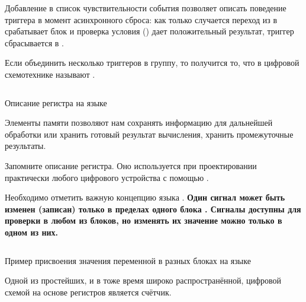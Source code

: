 \par{Добавление в список чувствительности события  позволяет описать поведение триггера в момент асинхронного сброса: как только случается переход  из  в  срабатывает блок  и проверка условия  () дает положительный результат, триггер сбрасывается в .}

\par{}

\par{Если объединить несколько триггеров в группу, то получится то, что в цифровой схемотехнике называют .}

%
\begin{listing}[H]
	\inputminted{SystemVerilog}{code_examples/lab_2/register.sv}
	\caption{Описание регистра на языке }
\end{listing}


\par{Элементы памяти позволяют нам сохранять информацию для дальнейшей обработки или хранить готовый результат вычисления, хранить промежуточные результаты.}

\par{Запомните описание регистра. Оно используется при проектировании практически любого цифрового устройства с помощью .}

\par{Необходимо отметить важную концепцию языка . \textbf{Один сигнал может быть изменен (записан) только в пределах одного блока . Сигналы доступны для проверки в любом из блоков, но изменять их значение можно только в одном из них.}}

%
\begin{listing}[H]
	\inputminted{SystemVerilog}{code_examples/lab_2/error_example.sv}
	\caption{Пример присвоения значения переменной в разных блоках  на языке }
\end{listing}


\par{Одной из простейших, и в тоже время широко распространённой, цифровой схемой на основе регистров является счётчик.}

